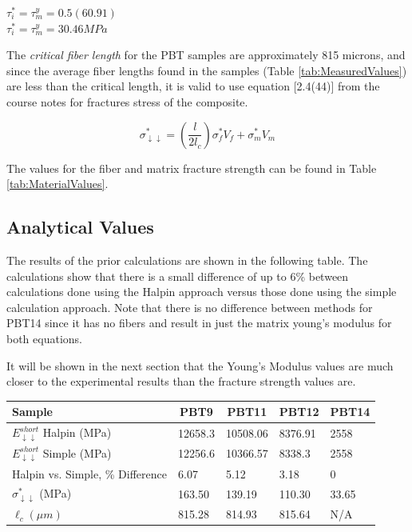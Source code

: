 \documentclass[11pt]{article}
\begin{document}
\begin{center}

\(\tau^*_i = \tau^y_m = 0.5(60.91)\)
\\
\(\tau^*_i = \tau^y_m = 30.46 MPa\)

\end{center}

The \textit{critical fiber length} for the PBT samples are approximately 815 microns, and since the average fiber lengths found in the samples (Table \ref{tab:MeasuredValues}) are less than the critical length, it is valid to use equation [2.4(44)] from the course notes \cite{course_notes} for fractures stress of the composite. 

\begin{equation} \label{eq:fracture}
\sigma^*_{\downarrow \downarrow} = \left( \frac{l}{2l_c}\right) \sigma_f^* V_f + \sigma^*_m V_m
\end{equation}

The values for the fiber and matrix fracture strength can be found in Table \ref{tab:MaterialValues}.

\subsection{Analytical Values}

The results of the prior calculations are shown in the following table. The calculations show that there is a small difference of up to 6\% between calculations done using the Halpin approach versus those done using the simple calculation approach. Note that there is no difference between methods for PBT14 since it has no fibers and result in just the matrix young's modulus for both equations.

It will be shown in the next section that the Young's Modulus values are much closer to the experimental results than the fracture strength values are.

\begin{center}
 \label{tab:CalculatedValues}
\begin{tabular}{p{3.5cm} || p{} | p{} | p{} | p{}}
\hline
Sample & \multicolumn{1}{c|}{PBT9} & \multicolumn{1}{c|}{PBT11} & \multicolumn{1}{c|}{PBT12} & \multicolumn{1}{c}{PBT14} \\
\hline
\hline
\(E^{short}_{\downarrow \downarrow}\) Halpin (MPa)& 12658.3 &  10508.06 & 8376.91 & 2558\\
\(E^{short}_{\downarrow \downarrow}\) Simple (MPa)& 12256.6 & 10366.57 & 8338.3 & 2558\\
\hline
Halpin vs. Simple, \% Difference & 6.07 & 5.12 & 3.18 & 0\\
\hline
\(\sigma^*_{\downarrow \downarrow}\) (MPa)& 163.50 & 139.19 & 110.30 & 33.65\\
\(\ell_c (\mu m) \) & 815.28 & 814.93 & 815.64 & N/A\\
\hline

\end{tabular}
\end{center}
\singlespacing
\end{document}
